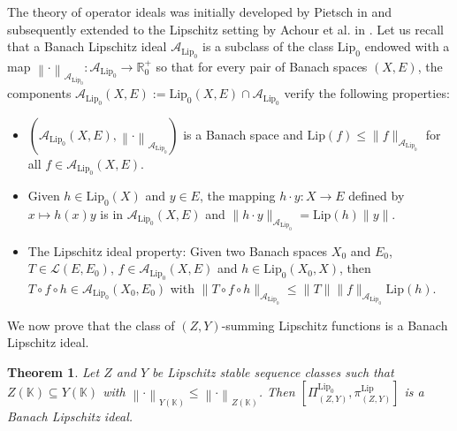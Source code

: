 \documentclass[12pt]{amsart}
\newtheorem{theorem}{Theorem}[section]
\def\A{\mathcal{A}}
\def\L{\mathcal{L}}
\def\K{\mathbb{K}}
\def\Lip{\mathrm{Lip}_0}
\def\Lipnorm{\mathrm{Lip}}
\begin{document}
The theory of operator ideals was initially developed by Pietsch in \cite{Pie-80} and subsequently extended to the Lipschitz setting by Achour et al. in \cite{AchRueSanYah-16}. Let us recall that a Banach Lipschitz ideal $\A_{\Lip}$ is a subclass of the class $\Lip$ endowed with a map $\left\|\cdot\right\|_{\A_{\Lip}}: \A_{\Lip} \to \mathbb{R}_0^+$ so that for every pair of Banach spaces $(X,E)$, the components $\A_{\Lip}(X,E) := \Lip(X,E)\cap \A_{\Lip}$ verify the following properties:
\begin{itemize}
	\item[$(i)$] $(\A_{\Lip}(X,E),\left\|\cdot\right\|_{\A_{\Lip}})$ is a Banach space and $\Lipnorm(f) \leq \|f\|_{\A_{\Lip}}$ for all $f \in \A_{\Lip}(X,E)$.
	\item[$(ii)$] Given $h \in \Lip(X)$ and $y \in E$, the mapping $h \cdot y: X \to E$ defined by $x \mapsto h(x)y$ is in $\A_{\Lip}(X,E)$ and $\|h \cdot y\|_{\A_{\Lip}} = \Lipnorm(h)\|y\|$.
	\item[$(iii)$] The Lipschitz ideal property: Given two Banach spaces $X_0$ and $E_0$, $T \in \L(E,E_0)$, $f \in \A_{\Lip}(X,E)$ and $h \in \Lip(X_0,X)$, then $T\circ f\circ h \in \A_{\Lip}(X_0,E_0)$ with $\|T\circ f\circ h\|_{\A_{\Lip}}\leq \|T\|\|f\|_{\A_{\Lip}}\Lipnorm(h)$.
\end{itemize}

We now prove that the class of $(Z,Y)$-summing Lipschitz functions is a Banach Lipschitz ideal.

\begin{theorem}\label{Th 8}
	Let $Z$ and $Y$ be Lipschitz stable sequence classes such that $Z(\K) \subseteq Y(\K)$ with $\left\|\cdot\right\|_{Y(\K)} \leq \left\|\cdot\right\|_{Z(\K)}$. Then $\left[\Pi_{(Z,Y)}^{\Lip},\pi_{(Z,Y)}^{\Lipnorm}\right]$ is a Banach Lipschitz ideal.
\end{theorem}
\end{document}
